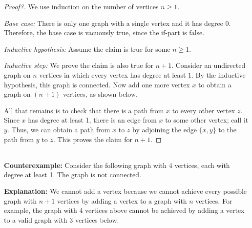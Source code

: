 \documentclass[11pt]{article}
\begin{document}
\begin{proof}[Proof?]
  We use induction on the number of vertices $n \ge 1$.

\emph{Base case:} There is only one graph with a single vertex and it has degree 0. Therefore, the base case is vacuously true, since the if-part is false.

\emph{Inductive hypothesis:} Assume the claim is true for some $n \ge 1$.

\emph{Inductive step:} We prove the claim is also true for $n+1$. Consider an undirected graph on $n$ vertices in which every vertex has degree at least 1. By the inductive hypothesis, this graph is connected. Now add one more vertex $x$ to obtain a graph on $(n + 1)$ vertices, as shown below.
\begin{center}
\end{center}
All that remains is to check that there is a path from $x$ to every other vertex $z$. Since $x$
has degree at least 1, there is an edge from $x$ to some other vertex; call it $y$. Thus, we
can obtain a path from $x$ to $z$ by adjoining the edge $\{x,y\}$ to the path from $y$ to $z$. This
proves the claim for $n+1$. 
\end{proof}

\begin{solution}
    \\
    \textbf{Counterexample:} Consider the following graph with 4 vertices, each with degree at least 1. The graph is not connected.
    \begin{center}
    \end{center}
    \textbf{Explanation:} We cannot add a vertex because we cannot achieve every possible graph with $n+1$ vertices by adding a vertex to a graph with $n$ vertices. For example, the graph with 4 vertices above cannot be achieved by adding a vertex to a valid graph with 3 vertices below.
\end{solution}
\end{document}
